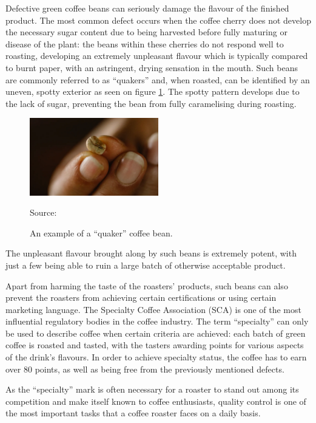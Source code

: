 Defective green coffee beans can seriously damage the flavour of the finished product.
The most common defect occurs when the coffee cherry does not develop the necessary sugar content
due to being harvested before fully maturing or disease of the plant:
the beans within these cherries do not respond well to roasting, developing an extremely unpleasant flavour
which is typically compared to burnt paper, with an astringent, drying sensation in the mouth.
Such beans are commonly referred to as ``quakers'' and, when roasted, can be identified by
an uneven, spotty exterior as seen on figure \ref{fig:quakerBeanExample}.
The spotty pattern develops due to the lack of sugar, preventing the bean from fully caramelising during roasting.
\begin{figure}
    \includegraphics[width=0.5\textwidth]{figures/introduction/quaker-coffee-bean}
    \caption*{Source: \cite{quakerBeanImg}}
    \caption{An example of a ``quaker'' coffee bean.}
    \label{fig:quakerBeanExample}
\end{figure}
The unpleasant flavour brought along by such beans is extremely potent, with just a few being able to ruin a large batch
of otherwise acceptable product.

Apart from harming the taste of the roasters' products, such beans can also prevent the roasters from achieving certain
certifications or using certain marketing language.
The Specialty Coffee Association (SCA) is one of the most influential regulatory bodies in the coffee industry.
The term ``specialty'' can only be used to describe coffee when certain criteria are achieved:
each batch of green coffee is roasted and tasted, with the tasters awarding points for various aspects of the drink's flavours.
In order to achieve specialty status, the coffee has to earn over 80 points, as well as being free from the previously mentioned defects.

As the ``specialty'' mark is often necessary for a roaster to stand out among its competition and make itself known to
coffee enthusiasts, quality control is one of the most important tasks that a coffee roaster faces on a daily basis.


